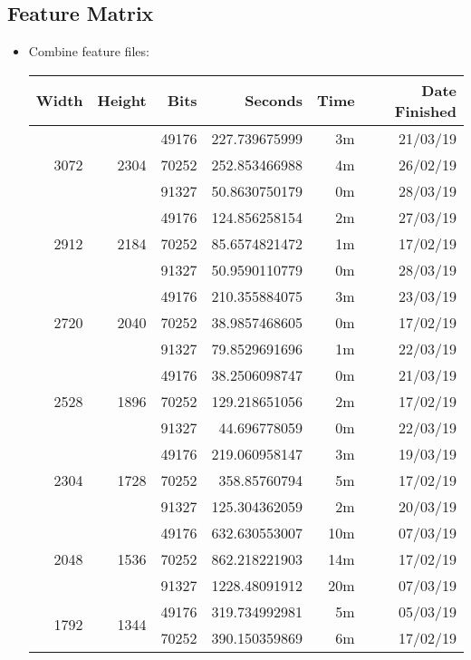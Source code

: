 \subsection{Feature Matrix}
\begin{itemize}
  \item Combine feature files:
  \begin{center}
  \begin{tabular}{ r r r | r r r }
  Width & Height & Bits & Seconds & Time & Date Finished \\ \hline
  \multirow{3}{*}{3072} & \multirow{3}{*}{2304} & 49176 & 227.739675999 & 3m & 21/03/19 \\
  & 2304 & 70252 & 252.853466988 & 4m & 26/02/19 \\
  & 2304 & 91327 & 50.8630750179 & 0m & 28/03/19 \\
  \hline
  \multirow{3}{*}{2912} & \multirow{3}{*}{2184} & 49176 & 124.856258154 & 2m & 27/03/19 \\
  & & 70252 & 85.6574821472 & 1m & 17/02/19 \\
  & & 91327 & 50.9590110779 & 0m & 28/03/19 \\
  \hline
  \multirow{3}{*}{2720} & \multirow{3}{*}{2040} & 49176 & 210.355884075 & 3m & 23/03/19 \\
  & & 70252 & 38.9857468605 & 0m & 17/02/19 \\
  & & 91327 & 79.8529691696 & 1m & 22/03/19 \\
  \hline
  \multirow{3}{*}{2528} & \multirow{3}{*}{1896} & 49176 & 38.2506098747 & 0m & 21/03/19 \\
  & & 70252 & 129.218651056 & 2m & 17/02/19 \\
  & & 91327 & 44.696778059 & 0m & 22/03/19 \\
  \hline
  \multirow{3}{*}{2304} & \multirow{3}{*}{1728} & 49176 & 219.060958147 & 3m & 19/03/19 \\
  & & 70252 & 358.85760794 & 5m & 17/02/19 \\
  & & 91327 & 125.304362059 & 2m & 20/03/19 \\
  \hline
  \multirow{3}{*}{2048} & \multirow{3}{*}{1536} & 49176 & 632.630553007 & 10m & 07/03/19 \\
  & & 70252 & 862.218221903 & 14m & 17/02/19 \\
  & & 91327 & 1228.48091912 & 20m & 07/03/19 \\
  \hline
  \multirow{3}{*}{1792} & \multirow{3}{*}{1344} & 49176 & 319.734992981 & 5m & 05/03/19 \\
  & & 70252 & 390.150359869 & 6m & 17/02/19 \\

\end{tabular}
\end{center}
\end{itemize}
